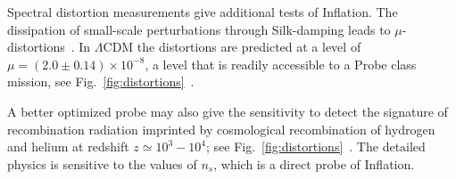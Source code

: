 Spectral distortion measurements give additional tests of Inflation. The dissipation of small-scale 
perturbations through Silk-damping leads to $\mu$-distortions~\cite{Sunyaev1970diss, Daly1991, Hu1994, Chluba2012}. 
In $\Lambda$CDM the distortions are predicted at a level of $\mu=(2.0\pm0.14)\times 10^{-8}$, a level that 
is readily accessible to a Probe class mission, see Fig.~\ref{fig:distortions}~\cite{Chluba2012, Chluba2016LCDM}. 

A better optimized probe may also give the sensitivity to detect the signature of recombination 
radiation imprinted by cosmological recombination of hydrogen and helium 
at redshift $z\simeq 10^3-10^4$; see Fig.~\ref{fig:distortions}~\citep{Sunyaev2009, Chluba2016}. 
The detailed physics is sensitive to the values of $n_{s}$, which is a direct probe of Inflation. 




